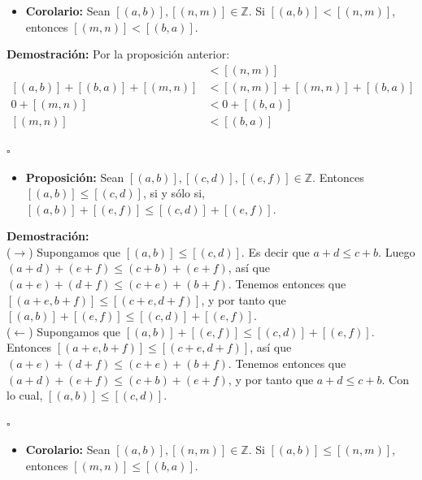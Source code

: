 \documentclass[10 pt]{article}
\begin{document}
\begin{itemize}
    \item \Large{\textbf{Corolario:} Sean $[(a,b)],[(n,m)] \in \mathbb Z$. Si $[(a,b)]<[(n,m)]$, entonces $[(m,n)]<[(b,a)]$.} \\
\end{itemize}

\Large{\textbf{Demostración:} Por la proposición anterior:}
\begin{align*}
    [(a,b)]&<[(n,m)] \\
    [(a,b)]+[(b,a)]+[(m,n)]&<[(n,m)]+[(m,n)]+[(b,a)] \\
    0+[(m,n)]&<0+[(b,a)] \\
    [(m,n)]&<[(b,a)]
\end{align*}
\begin{flushright}
    $\square$
\end{flushright}

\begin{itemize}
    \item \Large{\textbf{Proposición:} Sean $[(a,b)],[(c,d)],[(e,f)] \in \mathbb Z$. Entonces $[(a,b)] \leq [(c,d)]$, si y sólo si, $[(a,b)]+[(e,f)] \leq [(c,d)]+[(e,f)]$.} \\
\end{itemize}

\Large{\textbf{Demostración:} \\

($\rightarrow$) Supongamos que $[(a,b)] \leq [(c,d)]$. Es decir que $a+d \leq c+b$. Luego $(a+d)+(e+f) \leq (c+b)+(e+f)$, así que $(a+e)+(d+f) \leq (c+e)+(b+f)$. Tenemos entonces que $[(a+e,b+f)] \leq [(c+e,d+f)]$, y por tanto que $[(a,b)]+[(e,f)] \leq [(c,d)]+[(e,f)]$. \\

($\leftarrow$) Supongamos que $[(a,b)]+[(e,f)] \leq [(c,d)]+[(e,f)]$. Entonces $[(a+e,b+f)] \leq [(c+e,d+f)]$, así que $(a+e)+(d+f) \leq (c+e)+(b+f)$. Tenemos entonces que $(a+d)+(e+f) \leq (c+b)+(e+f)$, y por tanto que $a+d \leq c+b$. Con lo cual, $[(a,b)] \leq [(c,d)]$.} \\

\begin{flushright}
    $\square$
\end{flushright}
\begin{itemize}
    \item \Large{\textbf{Corolario:} Sean $[(a,b)],[(n,m)] \in \mathbb Z$. Si $[(a,b)]\leq [(n,m)]$, entonces $[(m,n)]\leq [(b,a)]$.} \\
\end{itemize}
\end{document}
